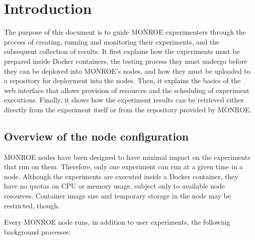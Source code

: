 \documentclass[a4paper,10pt]{article}
\newcommand{\monroe}{MONROE}
\begin{document}

\section{Introduction}
\label{sec:intro}

The purpose of this document is to guide \monroe{} experimenters through the process of creating, running and monitoring their experiments, and the subsequent collection of results.
It first explains how the experiments must be prepared inside Docker containers, the testing process they must undergo before they can be deployed into \monroe{}'s nodes, and how they must be uploaded to a repository for deployment into the nodes.
Then, it explains the basics of the web interface that allows provision of resources and the scheduling of experiment executions.
Finally, it shows how the experiment results can be retrieved either directly from the experiment itself or from the repository provided by \monroe{}.

\subsection{Overview of the node configuration}

\monroe{} nodes have been designed to have minimal impact on the experiments that run on them.
Therefore, only one experiment can run at a given time in a node.
Although the experiments are executed inside a Docker container, they have no quotas on CPU or memory usage, subject only to available node resources.
Container image size and temporary storage in the node may be restricted, though.

Every \monroe{} node runs, in addition to user experiments, the following background processes:
\end{document}
